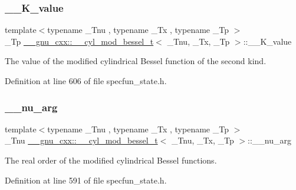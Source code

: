 \subsubsection{\texorpdfstring{\+\_\+\+\_\+\+K\+\_\+value}{\_\_K\_value}}
{\footnotesize\ttfamily template$<$typename \+\_\+\+Tnu , typename \+\_\+\+Tx , typename \+\_\+\+Tp $>$ \\
\+\_\+\+Tp \hyperlink{struct____gnu__cxx_1_1____cyl__mod__bessel__t}{\+\_\+\+\_\+gnu\+\_\+cxx\+::\+\_\+\+\_\+cyl\+\_\+mod\+\_\+bessel\+\_\+t}$<$ \+\_\+\+Tnu, \+\_\+\+Tx, \+\_\+\+Tp $>$\+::\+\_\+\+\_\+\+K\+\_\+value}



The value of the modified cylindrical Bessel function of the second kind. 



Definition at line 606 of file specfun\+\_\+state.\+h.

\mbox{\label{struct____gnu__cxx_1_1____cyl__mod__bessel__t_a482597cb5cc7de3449debeb0a451a757}} 
\subsubsection{\texorpdfstring{\+\_\+\+\_\+nu\+\_\+arg}{\_\_nu\_arg}}
{\footnotesize\ttfamily template$<$typename \+\_\+\+Tnu , typename \+\_\+\+Tx , typename \+\_\+\+Tp $>$ \\
\+\_\+\+Tnu \hyperlink{struct____gnu__cxx_1_1____cyl__mod__bessel__t}{\+\_\+\+\_\+gnu\+\_\+cxx\+::\+\_\+\+\_\+cyl\+\_\+mod\+\_\+bessel\+\_\+t}$<$ \+\_\+\+Tnu, \+\_\+\+Tx, \+\_\+\+Tp $>$\+::\+\_\+\+\_\+nu\+\_\+arg}



The real order of the modified cylindrical Bessel functions. 



Definition at line 591 of file specfun\+\_\+state.\+h.

\mbox{\label{struct____gnu__cxx_1_1____cyl__mod__bessel__t_ad23dcffe64b074804b84abe4d0da7515}} 
